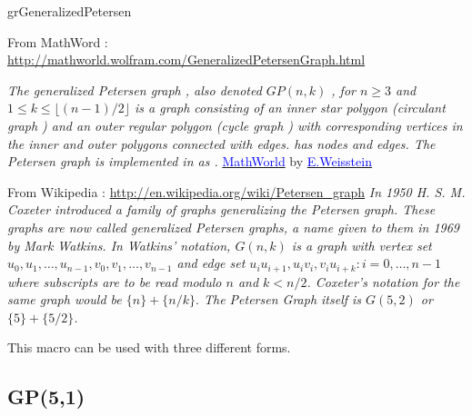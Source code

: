 \vfill\newpage

\begin{NewMacroBox}{grGeneralizedPetersen}{}

\medskip
From MathWord : \url{http://mathworld.wolfram.com/GeneralizedPetersenGraph.html}

\emph{The generalized Petersen graph , also denoted $GP(n,k)$  , for $n \geq 3$ and $1\leq k \leq \lfloor (n-1)/2\rfloor $ is a graph consisting of an inner star polygon  (circulant graph ) and an outer regular polygon  (cycle graph ) with corresponding vertices in the inner and outer polygons connected with edges.  has  nodes and  edges. The Petersen graph is implemented in  as .}
\href{http://mathworld.wolfram.com/GeneralizedPetersenGraph.html}%
           {\textcolor{blue}{MathWorld}} by \href{http://en.wikipedia.org/wiki/Eric_W._Weisstein}%
           {\textcolor{blue}{E.Weisstein}}

\medskip
From Wikipedia : \url{http://en.wikipedia.org/wiki/Petersen_graph}
\emph{In 1950 H. S. M. Coxeter introduced a family of graphs generalizing the Petersen graph. These graphs are now called generalized Petersen graphs, a name given to them in 1969 by Mark Watkins. In Watkins' notation, $G(n,k)$ is a graph with vertex set\hfill\break
 ${u_0, u_1,\dots, u_{n-1}, v_0, v_1, \dots, v_{n-1}}$\hfill\break
and edge set\hfill\break
${u_i u_{i+1}, u_i v_i, v_i u_{i+k}: i = 0,\dots,n-1}$\hfill\break
where subscripts are to be read modulo $n$ and $k<n/2$. Coxeter's notation for the same graph would be $\{n\}+\{n/k\}.$
The Petersen Graph itself is $G(5,2)$ or $\{5\}+\{5/2\}$.
}

This macro can be used with three different forms.
\end{NewMacroBox}

\subsection{ GP(5,1)}
\begin{center}
\begin{tkzexample}[vbox]
\end{tkzexample} 
\end{center}

